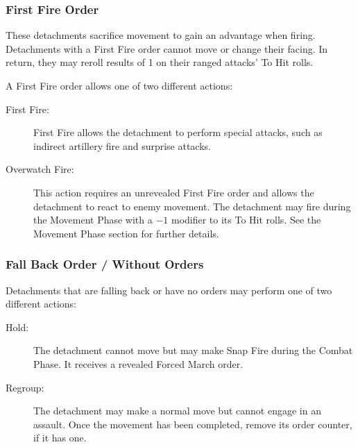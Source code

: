 \subsubsection{First Fire Order}

These detachments sacrifice movement to gain an advantage when firing. Detachments with a First Fire order cannot move or change their facing. In return, they may reroll results of 1 on their ranged attacks' To Hit rolls.

A First Fire order allows one of two different actions:

\begin{description}
    \item[First Fire:] First Fire allows the detachment to perform special attacks, such as indirect artillery fire and surprise attacks.

    \item[Overwatch Fire:] This action requires an unrevealed First Fire order and allows the detachment to react to enemy movement. The detachment may fire during the Movement Phase with a $-1$ modifier to its To Hit rolls. See the Movement Phase section for further details.
\end{description}

\subsubsection{Fall Back Order / Without Orders}

Detachments that are falling back or have no orders may perform one of two different actions:

\begin{description}
    \item[Hold:] The detachment cannot move but may make Snap Fire during the Combat Phase. It receives a revealed Forced March order.

    \item[Regroup:] The detachment may make a normal move but cannot engage in an assault. Once the movement has been completed, remove its order counter, if it has one.
\end{description}

